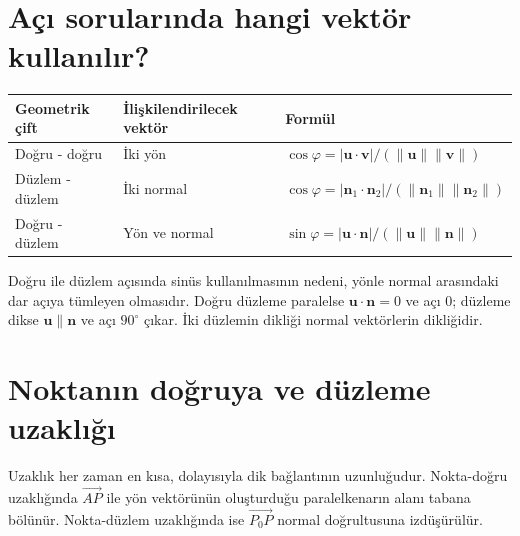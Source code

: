 \section{Açı sorularında hangi vektör kullanılır?}
\begin{center}\small\renewcommand{\arraystretch}{1.35}\begin{tabularx}{\linewidth}{>{\raggedright\arraybackslash}X >{\raggedright\arraybackslash}X >{\raggedright\arraybackslash}X}\toprule
\textbf{Geometrik çift} & \textbf{İlişkilendirilecek vektör} & \textbf{Formül}\\\midrule
Doğru - doğru & İki yön & \(\cos\varphi=|\mathbf u\cdot\mathbf v|/(\|\mathbf u\|\|\mathbf v\|)\)\\
Düzlem - düzlem & İki normal & \(\cos\varphi=|\mathbf n_1\cdot\mathbf n_2|/(\|\mathbf n_1\|\|\mathbf n_2\|)\)\\
Doğru - düzlem & Yön ve normal & \(\sin\varphi=|\mathbf u\cdot\mathbf n|/(\|\mathbf u\|\|\mathbf n\|)\)\\
\bottomrule\end{tabularx}\end{center}
Doğru ile düzlem açısında sinüs kullanılmasının nedeni, yönle normal arasındaki dar açıya tümleyen olmasıdır. Doğru düzleme paralelse \(\mathbf u\cdot\mathbf n=0\) ve açı 0; düzleme dikse \(\mathbf u\parallel\mathbf n\) ve açı \(90^\circ\) çıkar. İki düzlemin dikliği normal vektörlerin dikliğidir.

\section{Noktanın doğruya ve düzleme uzaklığı}
Uzaklık her zaman en kısa, dolayısıyla dik bağlantının uzunluğudur. Nokta-doğru uzaklığında \(\overrightarrow{AP}\) ile yön vektörünün oluşturduğu paralelkenarın alanı tabana bölünür. Nokta-düzlem uzaklığında ise \(\overrightarrow{P_0P}\) normal doğrultusuna izdüşürülür.


